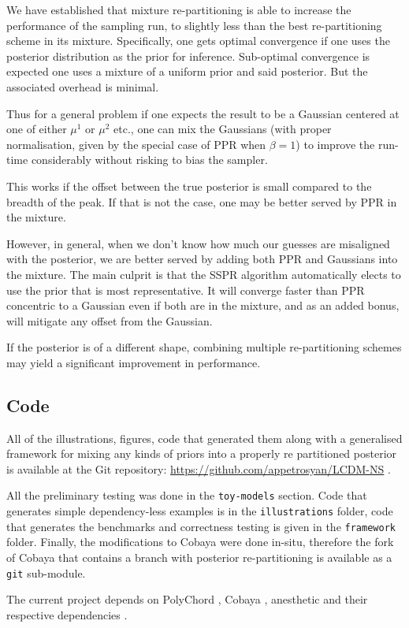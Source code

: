 \documentclass[usenatbib]{mnras}
\begin{document}
We have established that mixture re-partitioning is able to
increase the performance of the sampling run, to slightly less than
the best re-partitioning scheme in its mixture. Specifically, one
gets optimal convergence if one uses the posterior distribution as
the prior for inference. Sub-optimal convergence is expected one
uses a mixture of a uniform prior and said posterior. But the
associated overhead is minimal.

Thus for a general problem if one expects the result to be a
Gaussian centered at one of either \(\mu^{1}\) or \(\mu^{2}\) etc., one
can mix the Gaussians (with proper normalisation, given by the
special case of PPR when \(\beta=1\)) to improve the run-time
considerably without risking to bias the sampler.

This works if the offset between the true posterior is small
compared to the breadth of the peak. If that is not the case, one
may be better served by PPR in the mixture.

However, in general, when we don't know how much our guesses are
misaligned with the posterior, we are better served by adding both
PPR and Gaussians into the mixture. The main culprit is that the
SSPR algorithm automatically elects to use the prior that is most
representative. It will converge faster than PPR concentric to a
Gaussian even if both are in the mixture, and as an added bonus,
will mitigate any offset from the Gaussian. 

If the posterior is of a different shape, combining multiple
re-partitioning schemes may yield a significant improvement in
performance.
\subsection{Code}
\label{sec:orgfc0e53f}

All of the illustrations, figures, code that generated them along
with a generalised framework for mixing any kinds of priors into a
properly re partitioned posterior is available at the Git
repository: \url{https://github.com/appetrosyan/LCDM-NS} \cite{sspr}. 

All the preliminary testing was done in the \texttt{toy-models}
section. Code that generates simple dependency-less examples is in
the \texttt{illustrations} folder, code that generates the benchmarks and
correctness testing is given in the \texttt{framework} folder. Finally,
the modifications to Cobaya were done in-situ, therefore the fork
of Cobaya that contains a branch with posterior re-partitioning is
available as a \texttt{git} sub-module.

The current project depends on PolyChord \cite{polychord}, Cobaya
\cite{cobaya}, anesthetic \cite{anesthetic} and their respective
dependencies \cite{Blas_2011}.
\end{document}
